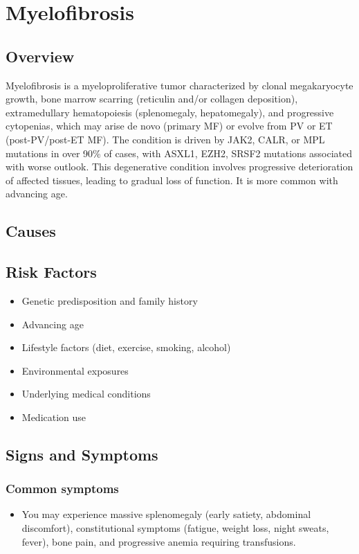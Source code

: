 \chapter{Myelofibrosis}
\label{sec:Myelofibrosis}

\section{Overview}
Myelofibrosis is a myeloproliferative tumor characterized by clonal megakaryocyte growth, bone marrow scarring (reticulin and/or collagen deposition), extramedullary hematopoiesis (splenomegaly, hepatomegaly), and progressive cytopenias, which may arise de novo (primary MF) or evolve from PV or ET (post-PV/post-ET MF). The condition is driven by JAK2, CALR, or MPL mutations in over 90\% of cases, with ASXL1, EZH2, SRSF2 mutations associated with worse outlook. This degenerative condition involves progressive deterioration of affected tissues, leading to gradual loss of function. It is more common with advancing age.
\section{Causes}
\section{Risk Factors}

\begin{itemize}[noitemsep]
  \item Genetic predisposition and family history
  \item Advancing age
  \item Lifestyle factors (diet, exercise, smoking, alcohol)
  \item Environmental exposures
  \item Underlying medical conditions
  \item Medication use
\end{itemize}
\section{Signs and Symptoms}

\subsection{Common symptoms}
\begin{itemize}[noitemsep]
  \item You may experience massive splenomegaly (early satiety, abdominal discomfort), constitutional symptoms (fatigue, weight loss, night sweats, fever), bone pain, and progressive anemia requiring transfusions. 
  \end{itemize}

